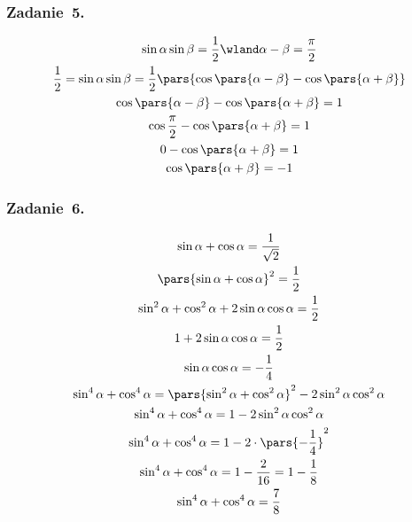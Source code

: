 \subsubsection*{Zadanie~5.}
\begin{gather*}
    \sin\alpha\sin\beta = \frac{1}{2} \wland \alpha - \beta = \frac{\pi}{2}\\
    \frac{1}{2} = \sin\alpha\sin\beta = \frac{1}{2}\pars{\cos\pars{\alpha - \beta} - \cos\pars{\alpha + \beta}}\\
    \cos\pars{\alpha - \beta} - \cos\pars{\alpha + \beta} = 1\\
    \cos\frac{\pi}{2} - \cos\pars{\alpha + \beta} = 1\\
    0 - \cos\pars{\alpha + \beta} = 1\\
    \cos\pars{\alpha + \beta} = -1
\end{gather*}
\subsubsection*{Zadanie~6.}
\begin{gather*}
    \sin\alpha + \cos\alpha = \frac{1}{\sqrt{2}}\\
    \pars{\sin\alpha + \cos\alpha}^2 = \frac{1}{2}\\
    \sin^2\alpha + \cos^2\alpha + 2\sin\alpha\cos\alpha = \frac{1}{2}\\
    1 + 2\sin\alpha\cos\alpha = \frac{1}{2}\\
    \sin\alpha\cos\alpha = -\frac{1}{4}\\
    \sin^4\alpha + \cos^4\alpha = \pars{\sin^2\alpha + \cos^2\alpha}^2 - 2\sin^2\alpha\cos^2\alpha\\
    \sin^4\alpha + \cos^4\alpha = 1 - 2\sin^2\alpha\cos^2\alpha\\
    \sin^4\alpha + \cos^4\alpha = 1 - 2 \cdot \pars{-\frac{1}{4}}^2\\
    \sin^4\alpha + \cos^4\alpha = 1 - \frac{2}{16} = 1 - \frac{1}{8}\\
    \sin^4\alpha + \cos^4\alpha = \frac{7}{8}
\end{gather*}
